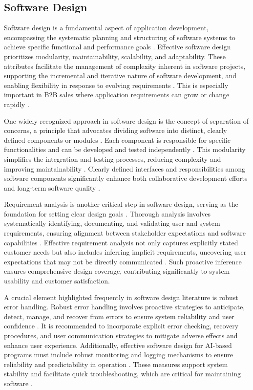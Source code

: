 \subsection{Software Design}

Software design is a fundamental aspect of application development, encompassing the systematic planning and structuring of software systems to achieve specific functional and performance goals \cite{yau1986survey}. Effective software design prioritizes modularity, maintainability, scalability, and adaptability. These attributes facilitate the management of complexity inherent in software projects, supporting the incremental and iterative nature of software development, and enabling flexibility in response to evolving requirements \cite{tang2010software}. This is especially important in B2B sales where application requirements can grow or change rapidly \cite{rodriguez2020digitalization}.

One widely recognized approach in software design is the concept of separation of concerns, a principle that advocates dividing software into distinct, clearly defined components or modules \cite{moreira2005multi}. Each component is responsible for specific functionalities and can be developed and tested independently \cite{yau1986survey}. This modularity simplifies the integration and testing processes, reducing complexity and improving maintainability \cite{song1994engineering}. Clearly defined interfaces and responsibilities among software components significantly enhance both collaborative development efforts and long-term software quality \cite{yau1986survey}.

Requirement analysis is another critical step in software design, serving as the foundation for setting clear design goals \cite{sonnentag2006expertise}. Thorough analysis involves systematically identifying, documenting, and validating user and system requirements, ensuring alignment between stakeholder expectations and software capabilities \cite{yau1986survey}. Effective requirement analysis not only captures explicitly stated customer needs but also includes inferring implicit requirements, uncovering user expectations that may not be directly communicated \cite{tang2010software}. Such proactive inference ensures comprehensive design coverage, contributing significantly to system usability and customer satisfaction.

A crucial element highlighted frequently in software design literature is robust error handling. Robust error handling involves proactive strategies to anticipate, detect, manage, and recover from errors to ensure system reliability and user confidence \cite{yau1986survey}. It is recommended to incorporate explicit error checking, recovery procedures, and user communication strategies to mitigate adverse effects and enhance user experience. Additionally, effective software design for AI-based programs must include robust monitoring and logging mechanisms to ensure reliability and predictability in operation \cite{bosch2020engineering}. These measures support system stability and facilitate quick troubleshooting, which are critical for maintaining software \cite{yau1986survey}.

